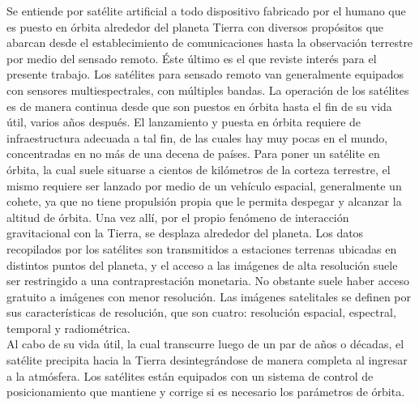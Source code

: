 Se entiende por satélite artificial a todo dispositivo fabricado por el humano que es puesto en órbita alrededor del planeta Tierra con diversos propósitos que abarcan desde el establecimiento de comunicaciones hasta la observación terrestre por medio del sensado remoto. Éste último es el que reviste interés para el presente trabajo. Los satélites para sensado remoto van generalmente equipados con sensores multiespectrales, con múltiples bandas. La operación de los satélites es de manera continua desde que son puestos en órbita hasta el fin de su vida útil, varios años después. El lanzamiento y puesta en órbita requiere de infraestructura adecuada a tal fin, de las cuales hay muy pocas en el mundo, concentradas en no más de una decena de países. Para poner un satélite en órbita, la cual suele situarse a cientos de kilómetros de la corteza terrestre, el mismo requiere ser lanzado por medio de un vehículo espacial, generalmente un cohete, ya que no tiene propulsión propia que le permita despegar y alcanzar la altitud de órbita. Una vez allí, por el propio fenómeno de interacción gravitacional con la Tierra, se desplaza alrededor del planeta. 
Los datos recopilados por los satélites son transmitidos a estaciones terrenas ubicadas en distintos puntos del planeta, y el acceso a las imágenes de alta resolución suele ser restringido a una contraprestación monetaria. No obstante suele haber acceso gratuito a imágenes con menor resolución. Las imágenes satelitales se definen por sus características de resolución, que son cuatro: resolución espacial, espectral, temporal y radiométrica.\\
Al cabo de su vida útil, la cual transcurre luego de un par de años o décadas, el satélite precipita hacia la Tierra desintegrándose de manera completa al ingresar a la atmósfera. Los satélites están equipados con un sistema de control de posicionamiento que mantiene y corrige si es necesario los parámetros de órbita.\\

